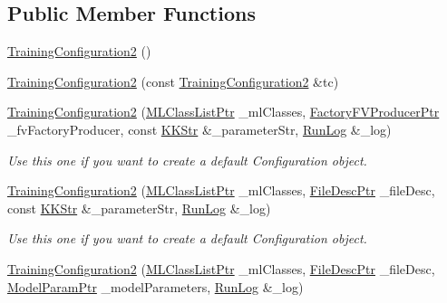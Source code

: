 \subsection*{Public Member Functions}
\begin{DoxyCompactItemize}
\item 
\hyperlink{class_k_k_m_l_l_1_1_training_configuration2_a30f123ba51f4a4c91f8824fff105ebf3}{Training\+Configuration2} ()
\item 
\hyperlink{class_k_k_m_l_l_1_1_training_configuration2_a948ca17c584b775cf1786266672dee0a}{Training\+Configuration2} (const \hyperlink{class_k_k_m_l_l_1_1_training_configuration2}{Training\+Configuration2} \&tc)
\item 
\hyperlink{class_k_k_m_l_l_1_1_training_configuration2_a171c1c9bd368d5936f032c8edc7e2aa4}{Training\+Configuration2} (\hyperlink{namespace_k_k_m_l_l_af091cde3f4a4315658b41a5e7583fc26}{M\+L\+Class\+List\+Ptr} \+\_\+ml\+Classes, \hyperlink{namespace_k_k_m_l_l_a82812d1feb85a6cff72d059bc67bb90e}{Factory\+F\+V\+Producer\+Ptr} \+\_\+fv\+Factory\+Producer, const \hyperlink{class_k_k_b_1_1_k_k_str}{K\+K\+Str} \&\+\_\+parameter\+Str, \hyperlink{class_k_k_b_1_1_run_log}{Run\+Log} \&\+\_\+log)
\begin{DoxyCompactList}\small\item\em Use this one if you want to create a default Configuration object. \end{DoxyCompactList}\item 
\hyperlink{class_k_k_m_l_l_1_1_training_configuration2_ac02e01eec63bad26c71628e1859c429e}{Training\+Configuration2} (\hyperlink{namespace_k_k_m_l_l_af091cde3f4a4315658b41a5e7583fc26}{M\+L\+Class\+List\+Ptr} \+\_\+ml\+Classes, \hyperlink{namespace_k_k_m_l_l_aa0d0b6ab4ec18868a399b8455b05d914}{File\+Desc\+Ptr} \+\_\+file\+Desc, const \hyperlink{class_k_k_b_1_1_k_k_str}{K\+K\+Str} \&\+\_\+parameter\+Str, \hyperlink{class_k_k_b_1_1_run_log}{Run\+Log} \&\+\_\+log)
\begin{DoxyCompactList}\small\item\em Use this one if you want to create a default Configuration object. \end{DoxyCompactList}\item 
\hyperlink{class_k_k_m_l_l_1_1_training_configuration2_ac0d12ef10d594614053f56655d9e6344}{Training\+Configuration2} (\hyperlink{namespace_k_k_m_l_l_af091cde3f4a4315658b41a5e7583fc26}{M\+L\+Class\+List\+Ptr} \+\_\+ml\+Classes, \hyperlink{namespace_k_k_m_l_l_aa0d0b6ab4ec18868a399b8455b05d914}{File\+Desc\+Ptr} \+\_\+file\+Desc, \hyperlink{namespace_k_k_m_l_l_a76c2dec3304f1a2dc2e357872e4fb320}{Model\+Param\+Ptr} \+\_\+model\+Parameters, \hyperlink{class_k_k_b_1_1_run_log}{Run\+Log} \&\+\_\+log)

\end{DoxyCompactItemize}
